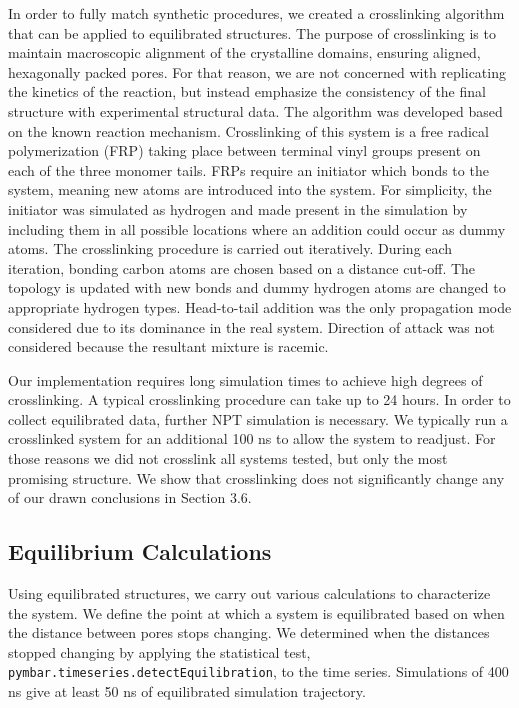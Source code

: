 \documentclass{article}
\begin{document}
  In order to fully match synthetic procedures, we created a crosslinking
  algorithm that can be applied to equilibrated structures. The purpose of 
  crosslinking
  is to maintain macroscopic alignment of the crystalline domains, 
  ensuring aligned, hexagonally packed pores. For that reason, we are not
  concerned with replicating the kinetics of the reaction, but instead emphasize
  the consistency of the final structure with experimental structural data. The
  algorithm was developed based on the known reaction mechanism. Crosslinking of
  this system is a free radical polymerization (FRP) taking place between
  terminal vinyl groups present on each of the three monomer tails. FRPs require
  an initiator which bonds to the system, meaning new atoms are introduced into
  the system. For simplicity, the initiator was simulated as hydrogen and made
  present in the simulation by including them in all possible locations where an 
  addition could occur as dummy atoms. The crosslinking procedure is carried out
  iteratively. During each iteration, bonding carbon atoms are chosen based on
  a distance cut-off. The topology is updated with new bonds and dummy hydrogen
  atoms are changed to appropriate hydrogen types. Head-to-tail addition was the
  only propagation mode considered due to its dominance in the real system.
  Direction of attack was not considered because the resultant mixture is
  racemic.

  Our implementation requires long simulation times to achieve high degrees of
  crosslinking. A typical crosslinking procedure can take up to 24 hours. In
  order to collect equilibrated data, further NPT simulation is necessary. We
  typically run a crosslinked system for an additional 100 ns to allow the system
  to readjust. For those reasons we did not crosslink all systems tested, but only
  the most promising structure. We show that crosslinking does not significantly
  change any of our drawn conclusions in Section 3.6.

  \subsection{Equilibrium Calculations}

  Using equilibrated structures, we carry out various calculations to
  characterize the system. We define the point at which a system is
  equilibrated based on when the distance between pores stops changing.
  We determined when the distances stopped changing by applying the statistical
  test, \texttt{pymbar.timeseries.detectEquilibration}, to the time series. 
  Simulations of 400 ns give at least 50 ns of equilibrated simulation trajectory.
\end{document}
